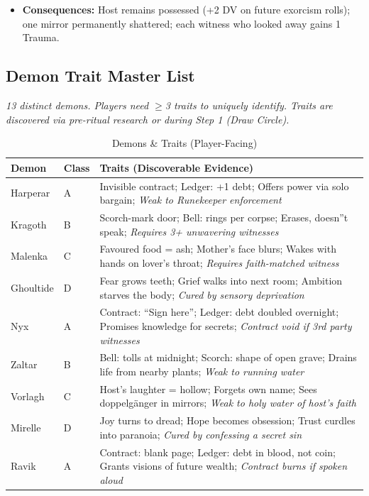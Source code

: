 \begin{itemize}
  \item \textbf{Consequences:} Host remains possessed (+2 DV on future exorcism rolls); one mirror permanently shattered; each witness who looked away gains 1 Trauma.
\end{itemize}

\subsection*{Demon Trait Master List}
\textit{13 distinct demons. Players need $\ge$3 traits to uniquely identify. Traits are discovered via pre-ritual research or during Step 1 (Draw Circle).}

\begin{table}[h!]
\centering
\caption{Demons \& Traits (Player-Facing)}
\begin{tabular}{@{}l l p{5.5cm}@{}}
\toprule
\rowcolor[gray]{0.9}
\textbf{Demon} & \textbf{Class} & \textbf{Traits (Discoverable Evidence)} \\
\midrule
Harperar & A & Invisible contract; Ledger: +1 debt; Offers power via solo bargain; \textit{Weak to Runekeeper enforcement} \\
Kragoth & B & Scorch-mark door; Bell: rings per corpse; Erases, doesn''t speak; \textit{Requires 3+ unwavering witnesses} \\
Malenka & C & Favoured food = ash; Mother's face blurs; Wakes with hands on lover's throat; \textit{Requires faith-matched witness} \\
Ghoultide & D & Fear grows teeth; Grief walks into next room; Ambition starves the body; \textit{Cured by sensory deprivation} \\
Nyx & A & Contract: ``Sign here''; Ledger: debt doubled overnight; Promises knowledge for secrets; \textit{Contract void if 3rd party witnesses} \\
Zaltar & B & Bell: tolls at midnight; Scorch: shape of open grave; Drains life from nearby plants; \textit{Weak to running water} \\
Vorlagh & C & Host's laughter = hollow; Forgets own name; Sees doppelgänger in mirrors; \textit{Weak to holy water of host's faith} \\
Mirelle & D & Joy turns to dread; Hope becomes obsession; Trust curdles into paranoia; \textit{Cured by confessing a secret sin} \\
Ravik & A & Contract: blank page; Ledger: debt in blood, not coin; Grants visions of future wealth; \textit{Contract burns if spoken aloud} \\

\end{tabular}
\end{table}
